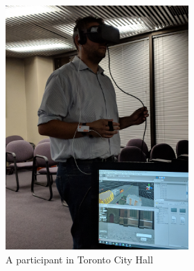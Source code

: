 \begin{figure}[!ht]
\begin{adjustbox}{varwidth=1.1\textwidth,fbox,center}
\centering
\begin{subfigure}{0.9\linewidth}

    \begin{subfigure}[b]{0.5\textwidth}
         \centering
         \includegraphics[trim=100 100 100 175,clip,
         scale=0.06]{chapter_4/figures/participant.jpg}
         \caption{A participant in Toronto City Hall}
     \end{subfigure}
     \hfill
     \begin{subfigure}[b]{0.5\textwidth}
         \centering

\end{subfigure}
\end{subfigure}
\end{adjustbox}
\end{figure}
